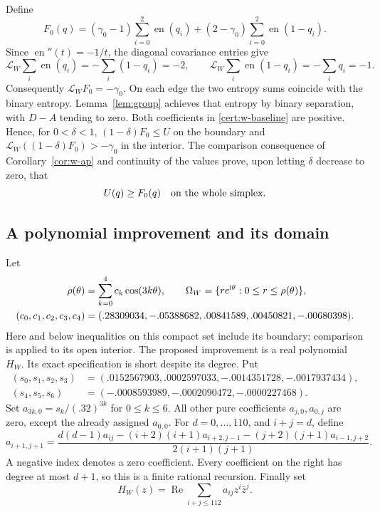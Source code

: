 \documentclass[11pt]{article}
\numberwithin{equation}{section}
\theoremstyle{definition}
\theoremstyle{remark}
\begin{document}
Define
\begin{equation}
 F_0(q)=(\gamma _0-1)\sum_{i=0}^2\operatorname{en}(q_i)
          +(2-\gamma _0)\sum_{i=0}^2\operatorname{en}(1-q_i).
 \label{cert:w-baseline}
\end{equation}
Since $\operatorname{en}''(t)=-1/t$, the diagonal covariance entries give
\[
 \mathcal L_W\sum_i\operatorname{en}(q_i)=-\sum_i(1-q_i)=-2,
 \qquad
 \mathcal L_W\sum_i\operatorname{en}(1-q_i)=-\sum_iq_i=-1.
\]
Consequently $\mathcal L_WF_0=-\gamma _0$.  On each edge the two
entropy sums coincide with the binary entropy.  Lemma~\ref{lem:group}
achieves that entropy by binary separation, with $D-A$ tending to zero.
Both coefficients in \eqref{cert:w-baseline} are positive.  Hence, for
$0<\delta<1$, $(1-\delta)F_0\le U$ on the boundary and
$\mathcal L_W((1-\delta)F_0)>-\gamma _0$ in the interior.
The comparison consequence of Corollary~\ref{cor:w-ap} and continuity of
the values prove, upon letting $\delta$ decrease to zero, that
\begin{equation}
 U(q)\ge F_0(q)\quad\hbox{on the whole simplex}.
 \label{cert:w-baseline-bound}
\end{equation}

\subsection{A polynomial improvement and its domain}

Let
\begin{align}
 \rho(\theta)&=\sum_{k=0}^4c_k\cos(3k\theta),\qquad
 \Omega_W=\{re^{\mathrm i\theta}:0\le r\le\rho(\theta)\},
 \label{cert:w-shell}\\
 (c_0,c_1,c_2,c_3,c_4)
   &=(.28309034,-.05388682,.00841589,.00450821,-.00680398).
 \notag
\end{align}
Here and below inequalities on this compact set include its boundary;
comparison is applied to its open interior.  The proposed improvement is
a real polynomial $H_W$.  Its exact specification is short despite its
degree.  Put
\begin{align*}
 (s_0,s_1,s_2,s_3)
   &=(.0152567903,.0002597033,-.0014351728,-.0017937434),\\
 (s_4,s_5,s_6)&=(-.0008593989,-.0002090472,-.0000227468).
\end{align*}
Set $a_{3k,0}=s_k/(.32)^{3k}$ for $0\le k\le6$.  All other pure
coefficients $a_{j,0},a_{0,j}$ are zero, except the already assigned
$a_{0,0}$.  For $d=0,\ldots,110$, and $i+j=d$, define
\begin{equation}
 a_{i+1,j+1}=
 \frac{d(d-1)a_{ij}-(i+2)(i+1)a_{i+2,j-1}
                      -(j+2)(j+1)a_{i-1,j+2}}
      {2(i+1)(j+1)}.
 \label{cert:w-recurrence}
\end{equation}
A negative index denotes a zero coefficient.  Every coefficient on the
right has degree at most $d+1$, so this is a finite rational recursion.
Finally set
\begin{equation}
 H_W(z)=\operatorname{Re}\sum_{i+j\le112}a_{ij}z^i\bar z^j.
 \label{cert:w-polynomial}
\end{equation}
\end{document}
